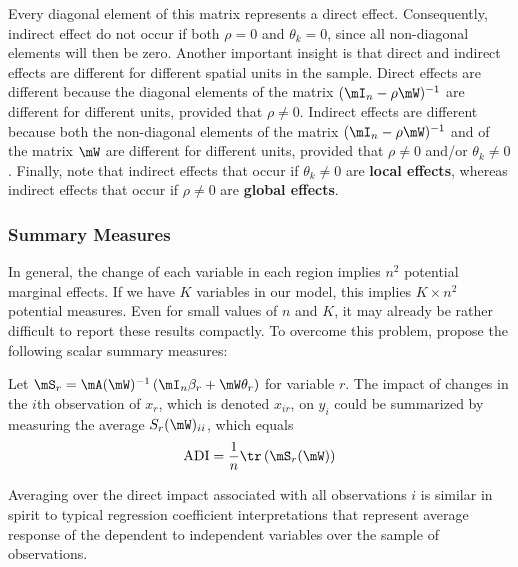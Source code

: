 \documentclass[english,12pt]{book}\usepackage[]{graphicx}\usepackage[]{xcolor}
\begin{document}
Every diagonal element of this matrix represents a direct effect. Consequently, indirect effect do not occur if both $\rho = 0$ and $\theta_k = 0$, since all non-diagonal elements will then be zero. Another important insight is that direct and indirect effects are different for different spatial units in the sample. Direct effects are different because the diagonal elements of the matrix $(\mI_n - \rho\mW)^{-1}$ are different for different units, provided that $\rho \neq 0$. Indirect effects are different because both the non-diagonal elements of the matrix $(\mI_n - \rho\mW)^{-1}$ and of the matrix $\mW$ are different for different units, provided that $\rho \neq 0$ and/or $\theta_k\neq 0$. Finally, note that indirect effects that occur if $\theta_k\neq 0$ are \textbf{local effects}, whereas indirect effects that occur if $\rho\neq 0$ are \textbf{global effects}. 

\subsubsection{Summary Measures}\label{sec:summary-measures}

In general, the change of each variable in each region implies $n^2$ potential marginal effects.  If we have $K$ variables in our model, this implies $K\times n^2$ potential measures. Even for small values of $n$ and $K$, it may already be rather difficult to report these results compactly. To overcome this problem, \citet[][p. 36-37]{lesage2010introduction} propose the following scalar summary measures: 

\begin{definition}\label{def:ADI}
Let $\mS_r = \mA(\mW)^{-1}\left(\mI_n\beta_r + \mW\theta_r\right)$ for variable $r$. The impact of changes in the $i$th observation of $x_r$, which is denoted $x_{ir}$, on $y_i$ could be summarized by measuring the average $S_r(\mW)_{ii}$, which equals
	\begin{equation*}
		\mbox{ADI} = \frac{1}{n}\tr\left(\mS_r(\mW)\right)
	\end{equation*}
\end{definition}

Averaging over the direct impact associated with all observations $i$ is similar in spirit to typical regression coefficient interpretations that represent average response of the dependent to independent variables over the sample of observations. 	
\end{document}
